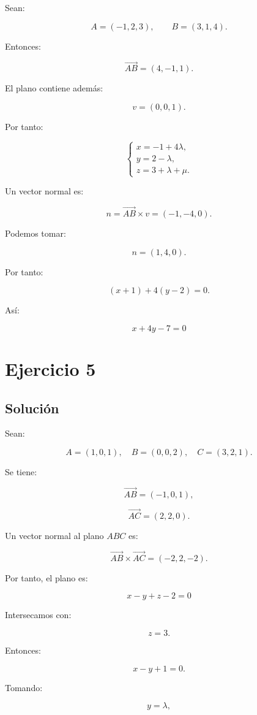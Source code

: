 \documentclass[11pt,a4paper]{article}
\begin{document}
Sean:

\[
A=(-1,2,3),
\qquad
B=(3,1,4).
\]

Entonces:

\[
\overrightarrow{AB}
=
(4,-1,1).
\]

El plano contiene además:

\[
v=(0,0,1).
\]

Por tanto:

\[
\boxed{
\begin{cases}
x=-1+4\lambda,\\
y=2-\lambda,\\
z=3+\lambda+\mu.
\end{cases}
}
\]

Un vector normal es:

\[
n
=
\overrightarrow{AB}\times v
=
(-1,-4,0).
\]

Podemos tomar:

\[
n=(1,4,0).
\]

Por tanto:

\[
(x+1)+4(y-2)=0.
\]

Así:

\[
\boxed{
x+4y-7=0
}
\]

\section{Ejercicio 5}
\subsection{Solución}

Sean:

\[
A=(1,0,1),
\quad
B=(0,0,2),
\quad
C=(3,2,1).
\]

Se tiene:

\[
\overrightarrow{AB}=(-1,0,1),
\]

\[
\overrightarrow{AC}=(2,2,0).
\]

Un vector normal al plano \(ABC\) es:

\[
\overrightarrow{AB}\times\overrightarrow{AC}
=
(-2,2,-2).
\]

Por tanto, el plano es:

\[
\boxed{
x-y+z-2=0
}
\]

Intersecamos con:

\[
z=3.
\]

Entonces:

\[
x-y+1=0.
\]

Tomando:

\[
y=\lambda,
\]
\end{document}
